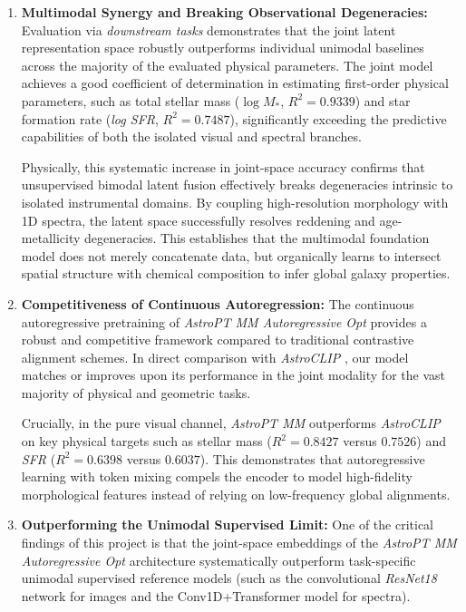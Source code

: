 \begin{enumerate}
	\item \textbf{Multimodal Synergy and Breaking Observational Degeneracies:} 
	Evaluation via \textit{downstream tasks} demonstrates that the joint latent representation space robustly outperforms individual unimodal baselines across the majority of the evaluated physical parameters. The joint model achieves a good coefficient of determination in estimating first-order physical parameters, such as total stellar mass ($\log M_*$, $R^2 = 0.9339$) and star formation rate (\textit{log \gls{SFR}}, $R^2 = 0.7487$), significantly exceeding the predictive capabilities of both the isolated visual and spectral branches. 
	
	Physically, this systematic increase in joint-space accuracy confirms that unsupervised bimodal latent fusion effectively breaks degeneracies intrinsic to isolated instrumental domains. By coupling high-resolution morphology with 1D spectra, the latent space successfully resolves reddening and age-metallicity degeneracies. This establishes that the multimodal foundation model does not merely concatenate data, but organically learns to intersect spatial structure with chemical composition to infer global galaxy properties.
	
	\item \textbf{Competitiveness of Continuous Autoregression:} 
	The continuous autoregressive pretraining of \textit{AstroPT MM Autoregressive Opt} provides a robust and competitive framework compared to traditional contrastive alignment schemes. In direct comparison with \textit{AstroCLIP} \autocite{ar:astroclip}, our model matches or improves upon its performance in the joint modality for the vast majority of physical and geometric tasks. 
	
	Crucially, in the pure visual channel, \textit{AstroPT MM} outperforms \textit{AstroCLIP} on key physical targets such as stellar mass ($R^2 = 0.8427$ versus $0.7526$) and \textit{\gls{SFR}} ($R^2 = 0.6398$ versus $0.6037$). This demonstrates that autoregressive learning with token mixing compels the encoder to model high-fidelity morphological features instead of relying on low-frequency global alignments.
	
	\item \textbf{Outperforming the Unimodal Supervised Limit:} 
	One of the critical findings of this project is that the joint-space embeddings of the \textit{AstroPT MM Autoregressive Opt} architecture systematically outperform task-specific unimodal supervised reference models (such as the convolutional \textit{ResNet18} network for images and the Conv1D+Transformer model for spectra). 
	

\end{enumerate}
